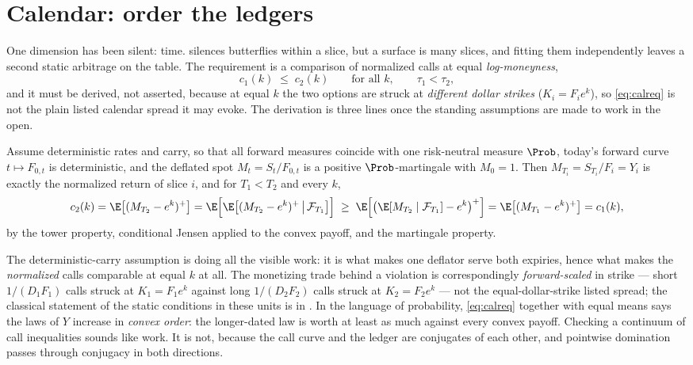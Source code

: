 \section{Calendar: order the ledgers}
\label{sec:calendar}

One dimension has been silent: time.   silences
butterflies within a slice, but a surface is many slices, and fitting
them independently leaves a second static arbitrage on the table.  The
requirement is a comparison of normalized calls at equal
\emph{log-moneyness},
\begin{equation}
c_1(k)\;\le\;c_2(k)
\qquad\text{for all }k,\qquad \tau_1<\tau_2 ,
\label{eq:calreq}
\end{equation}
and it must be derived, not asserted, because at equal $k$ the two
options are struck at \emph{different dollar strikes}
($K_i=F_ie^{k}$), so \eqref{eq:calreq} is not the plain listed calendar
spread it may evoke.  The derivation is three lines once the standing
assumptions are made to work in the open.

\begin{lemma}
\label{lem:caljensen}
Assume deterministic rates and carry, so that all forward measures
coincide with one risk-neutral measure $\Prob$, today's forward curve
$t\mapsto F_{0,t}$ is deterministic, and the deflated spot
$M_t=S_t/F_{0,t}$ is a positive $\Prob$-martingale with $M_0=1$.  Then
$M_{T_i}=S_{T_i}/F_i=Y_i$ is exactly the normalized return of slice
$i$, and for $T_1<T_2$ and every $k$,
\[
c_2(k)=\E\big[(M_{T_2}-e^{k})^{+}\big]
=\E\Big[\E\big[(M_{T_2}-e^{k})^{+}\,\big|\,\mathcal F_{T_1}\big]\Big]
\;\ge\;\E\Big[\big(\E[M_{T_2}\mid\mathcal F_{T_1}]-e^{k}\big)^{+}\Big]
=\E\big[(M_{T_1}-e^{k})^{+}\big]
=c_1(k),
\]
by the tower property, conditional Jensen applied to the convex payoff,
and the martingale property.
\end{lemma}

The deterministic-carry assumption is doing all the visible work: it is
what makes one deflator serve both expiries, hence what makes the
\emph{normalized} calls comparable at equal $k$ at all.  The
monetizing trade behind a violation is correspondingly
\emph{forward-scaled} in strike --- short $1/(D_1F_1)$ calls struck at
$K_1=F_1e^{k}$ against long $1/(D_2F_2)$ calls struck at
$K_2=F_2e^{k}$ --- not the equal-dollar-strike listed spread; the
classical statement of the static conditions in these units is in
\citet{CarrMadan2005}.  In the language of probability,
\eqref{eq:calreq} together with equal means says the laws of $Y$
increase in \emph{convex order}: the longer-dated law is worth at least
as much against every convex payoff.  Checking a continuum of call
inequalities sounds like work.  It is not, because the call curve and
the ledger are conjugates of each other, and pointwise domination
passes through conjugacy in both directions.

